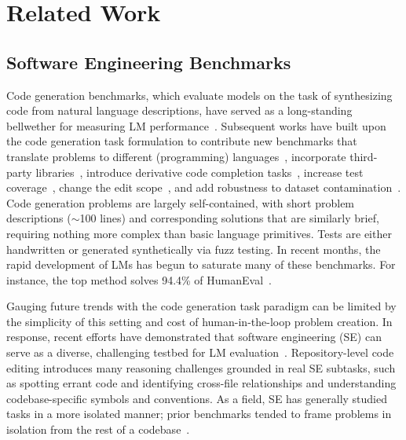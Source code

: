 \section{Related Work}

\subsection{Software Engineering Benchmarks}
Code generation benchmarks, which evaluate models on the task of synthesizing code from natural language descriptions, have served as a long-standing bellwether for measuring LM performance~\citep{chen2021evaluating,austin2021program,hendrycks2021measuring,lu2021codexglue}. 
Subsequent works have built upon the code generation task formulation to contribute new benchmarks that translate problems to different (programming) languages~\citep{cassano2022multiple,wang2023mconala}, incorporate third-party libraries~\citep{lai2022ds1000,liu2024mlbench}, introduce derivative code completion tasks~\citep{huang2024mlagentbench,muennighoff2023octopack}, increase test coverage~\citep{evalplus}, change the edit scope~\citep{ding2023crosscodeeval,du2023classeval,Yu2023CoderEvalAB}, and add robustness to dataset contamination~\citep{jain2024livecodebench}.
Code generation problems are largely self-contained, with short problem descriptions ($\sim$100 lines) and corresponding solutions that are similarly brief, requiring nothing more complex than basic language primitives.
Tests are either handwritten or generated synthetically via fuzz testing.
In recent months, the rapid development of LMs has begun to saturate many of these benchmarks.
For instance, the top method solves \num{94.4}\% of HumanEval~\citep{zhou2023language}.

Gauging future trends with the code generation task paradigm can be limited by the simplicity of this setting and cost of human-in-the-loop problem creation.
In response, recent efforts have demonstrated that software engineering (SE) can serve as a diverse, challenging testbed for LM evaluation~\citep{zhang2023repocoder,jimenez2024swebench,Liu2023RepoBenchBR}.
Repository-level code editing introduces many reasoning challenges grounded in real SE subtasks, such as spotting errant code and identifying cross-file relationships and understanding codebase-specific symbols and conventions.
As a field, SE has generally studied tasks in a more isolated manner; prior benchmarks tended to frame problems in isolation from the rest of a codebase~\citep{justJE2014defects,Karampatsis2019HowOD}.

